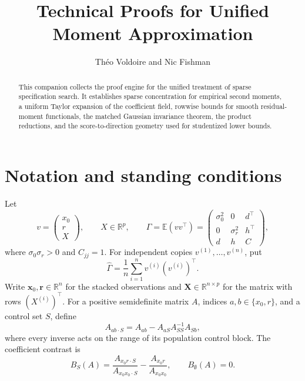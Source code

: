 \documentclass[a4paper,11pt,english]{article}
\title{Technical Proofs for Unified Moment Approximation}
\author{Th\'eo Voldoire and Nic Fishman}
\date{}
\newcommand{\E}{\mathbb E}
\newcommand{\R}{\mathbb R}
\begin{document}
\maketitle

\begin{abstract}
This companion collects the proof engine for the unified treatment of
sparse specification search.  It establishes sparse concentration for
empirical second moments, a uniform Taylor expansion of the coefficient
field, rowwise bounds for smooth residual-moment functionals, the matched
Gaussian invariance theorem, the product reductions, and the
score-to-direction geometry used for studentized lower bounds.
\end{abstract}

\section{Notation and standing conditions}

Let
\[
        v=\begin{pmatrix}x_0\\ r\\ X\end{pmatrix},
        \qquad X\in\R^p,
        \qquad
        \Gamma=\E(vv^\top)
        =\begin{pmatrix}
        \sigma_0^2&0&d^\top\\
        0&\sigma_r^2&h^\top\\
        d&h&C
        \end{pmatrix},
\]
where $\sigma_0\sigma_r>0$ and $C_{jj}=1$.  For independent copies
$v^{(1)},\ldots,v^{(n)}$, put
\[
        \hat\Gamma=\frac1n\sum_{i=1}^n v^{(i)}(v^{(i)})^\top.
\]
Write $\mathbf x_0,\mathbf r\in\R^n$ for the stacked observations and
$\mathbf X\in\R^{n\times p}$ for the matrix with rows $(X^{(i)})^\top$.
For a positive semidefinite matrix $A$, indices
$a,b\in\{x_0,r\}$, and a control set $S$, define
\begin{equation}\label{eq:residual-moment}
        A_{ab\mathbin{\cdot}S}
        =A_{ab}-A_{aS}A_{SS}^{-1}A_{Sb},
\end{equation}
where every inverse acts on the range of its population control block.
The coefficient contrast is
\begin{equation}\label{eq:coefficient-functional}
        B_S(A)
        =\frac{A_{x_0r\mathbin{\cdot}S}}
        {A_{x_0x_0\mathbin{\cdot}S}}
        -\frac{A_{x_0r}}{A_{x_0x_0}},
        \qquad B_\emptyset(A)=0.
\end{equation}
\end{document}
